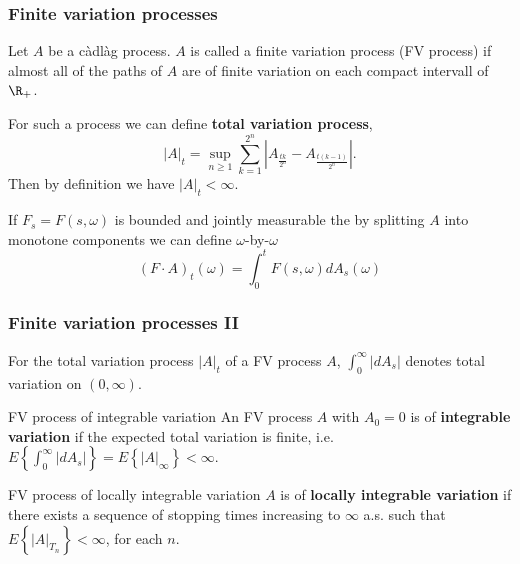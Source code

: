 \begin{frame}
    \frametitle{Finite variation processes}
    
    Let $A$ be a c\`adl\`ag process. $A$ is called a finite variation process (FV process)
    if almost all of the paths of $A$ are of finite variation on each compact intervall
    of $\R_+$.

    For such a process we can define \textbf{total variation process}, 
    \begin{equation}
        |A|_t = \sup_{n \geq 1} \sum_{k=1}^{2^n} | A_{\frac{tk}{2^n}} - A_{\frac{t(k-1)}{2^n}} |.
    \end{equation}
    Then by definition we have $|A|_t< \infty$. 

    If $F_s=F(s,\omega)$ is bounded and jointly measurable the by splitting $A$ into 
    monotone components we can define $\omega$-by-$\omega$
    \begin{equation}
        (F \cdot A)_{t}(\omega) = \int_{0}^{t} F(s,\omega) d A_s(\omega)
    \end{equation}

\end{frame}




\begin{frame}
    \frametitle{Finite variation processes II}

    For the total variation process $|A|_{t}$ of a FV process $A$, $\int_{0}^{\infty} |d A_{s}|$
    denotes total variation on $(0,\infty)$.

    \begin{block}{FV process of integrable variation}
        An FV process $A$ with $A_0=0$ is of \textbf{integrable variation} if the expected 
        total variation is finite, i.e. 
        $E\left\{ \int_{0}^{\infty} |d A_{s}| \right\} = E\left\{ |A|_{\infty} \right\}<\infty$.
    \end{block}

    \begin{block}{FV process of locally integrable variation}
        $A$ is of \textbf{locally integrable variation} if there exists a sequence of stopping times
        increasing to $\infty$ a.s. such that $E\left\{ |A|_{T_n} \right\}< \infty$, for each $n$.
    \end{block}
\end{frame}











